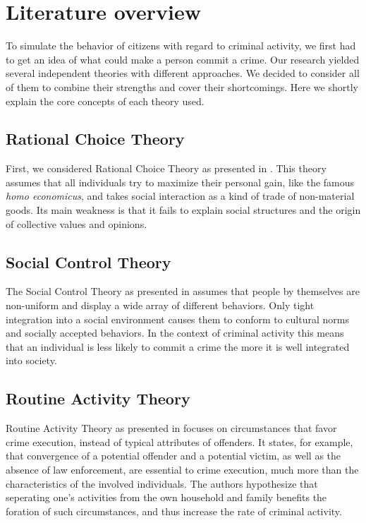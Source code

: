 \documentclass{JASSS}
\begin{document}
\section{Literature overview}
To simulate the behavior of citizens with regard to criminal activity, we first had to get an idea
of what could make a person commit a crime. Our research yielded several independent theories with
different approaches. We decided to consider all of them to combine their strengths and cover their
shortcomings. Here we shortly explain the core concepts of each theory used.

\subsection{Rational Choice Theory}
First, we considered Rational Choice Theory as presented in \citet{rationalchoice}. This theory
assumes that all individuals try to maximize their personal gain, like the famous \textit{homo
economicus}, and takes social interaction as a kind of trade of non-material goods. Its main
weakness is that it fails to explain social structures and the origin of collective values and
opinions.

\subsection{Social Control Theory}
The Social Control Theory as presented in \citet{socialcontrol} assumes that people by themselves
are non-uniform and display a wide array of different behaviors. Only tight integration into
a social environment causes them to conform to cultural norms and socially accepted behaviors.
In the context of criminal activity this means that an individual is less likely to commit a crime
the more it is well integrated into society.

\subsection{Routine Activity Theory}
Routine Activity Theory as presented in \citet{routineactivity} focuses on circumstances that
favor crime execution, instead of typical attributes of offenders. It states, for example, that
convergence of a potential offender and a potential victim, as well as the absence of law
enforcement, are essential to crime execution, much more than the characteristics of the
involved individuals. The authors hypothesize that seperating one's activities from the own
household and family benefits the foration of such circumstances, and thus increase the rate of
criminal activity.
\end{document}
